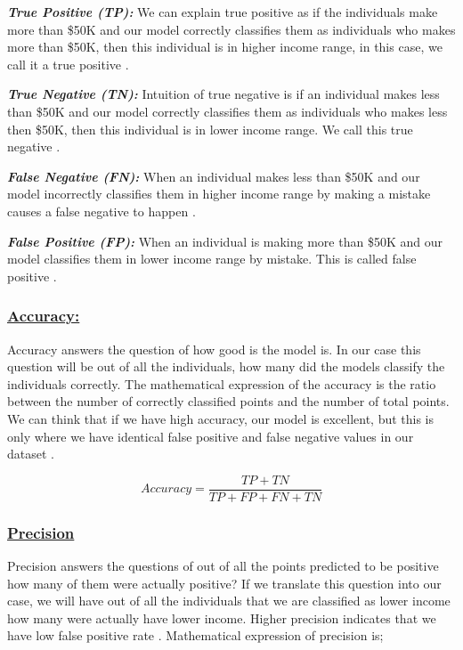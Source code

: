 \documentclass[sigconf]{acmart}
\begin{document}
\par \textbf{\textit{True Positive (TP):}} We can explain true positive as if the individuals make more than \$50K and our model correctly classifies them as individuals who makes more than \$50K, then this individual is in higher income range, in this case, we call it a true positive \cite{www-exsilio}. 

\par \textbf{\textit{True Negative (TN):}} Intuition of true negative is if an individual makes less than \$50K and our model correctly classifies them as individuals who makes less then \$50K, then this individual is in lower income range. We call this true negative \cite{www-exsilio}. 

\par \textbf{\textit{False Negative (FN):}} When an individual makes less than \$50K and our model incorrectly classifies them in higher income range by making a mistake causes a false negative to happen \cite{www-exsilio}.

\par \textbf{\textit{False Positive (FP):}} When an individual is making more than \$50K and our model classifies them in lower income range by mistake. This is called false positive \cite{www-exsilio}. 

\subsubsection{\textbf{\underline{Accuracy:}}}
Accuracy answers the question of how good is the model is. In our case this question will be out of all the individuals, how many did the models classify the individuals correctly. The mathematical expression of the accuracy is the ratio between the number of correctly classified points and the number of total points. We can think that if we have high accuracy, our model is excellent, but this is only where we have identical false positive and false negative values in our dataset \cite{www-exsilio}.

\begin{equation}
Accuracy = \frac{TP + TN} {TP + FP + FN + TN}
\end{equation}

\subsubsection{\textbf{\underline{Precision}}}
Precision answers the questions of out of all the points predicted to be positive how many of them were actually positive? If we translate this question into our case, we will have out of all the individuals that we are classified as lower income how many were actually have lower income. Higher precision indicates that we have low false positive rate \cite{www-exsilio}. Mathematical expression of precision is; 
\end{document}

